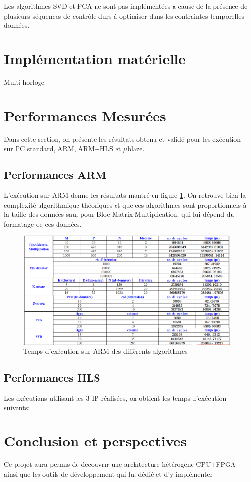 \documentclass[12pt,a4paper]{article}
\begin{document}
Les algorithmes SVD et PCA ne sont pas implémentées à cause de la présence de plusieurs séquences de contrôle durs à optimiser dans les contraintes temporelles données.

\section{Implémentation matérielle}





\label{SmartClock}
Multi-horloge

\section{Performances Mesurées}
Dans cette section, on présente les résultats obtenu et validé pour les exécution sur PC standard, ARM, ARM+HLS et $\mu$blaze.
\subsection{Performances ARM}
L'exécution sur ARM donne les résultats montré en figure \ref{fig:screenshot005}. On retrouve bien la complexité algorithmique théoriques et que ces algorithmes sont proportionnels à la taille des données sauf pour Bloc-Matrix-Multiplication. qui lui dépend du formatage de ces données.
\begin{figure}[H]
	\centering
	\includegraphics[width=\linewidth]{soft/screenshot005}
	\caption {Temps d'exécution sur ARM des différents algorithmes}
	\label{fig:screenshot005}
\end{figure}

\subsection{Performances HLS}
Les exécutions utilisant les 3 IP réalisées, on obtient les temps d'exécution  suivants:

\section{Conclusion et perspectives}
Ce projet aura permis de découvrir une architecture hétérogène CPU+FPGA ainsi que les outils de développement qui lui dédié et d'y implémenter
\end{document}
